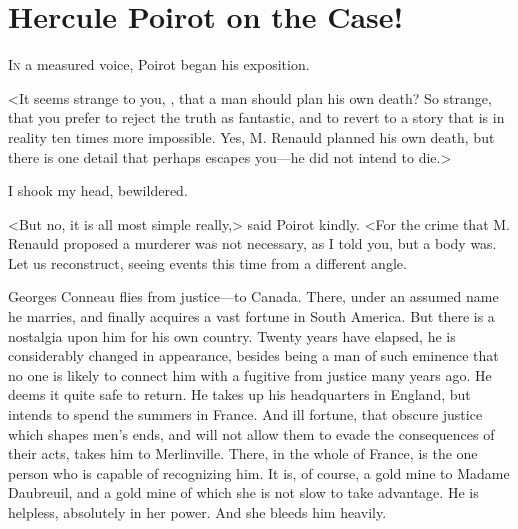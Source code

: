 \chapter{Hercule Poirot on the Case!}

\lettrine{I}{n} a measured voice, Poirot began his exposition. 

\zz
 <It seems strange to you, , that a man should plan his own death? So strange, that you prefer to reject the truth as fantastic, and to revert to a story that is in reality ten times more impossible. Yes, M. Renauld planned his own death, but there is one detail that perhaps escapes you—he did not intend to die.> 

 I shook my head, bewildered. 

 <But no, it is all most simple really,> said Poirot kindly. <For the crime that M. Renauld proposed a murderer was not necessary, as I told you, but a body was. Let us reconstruct, seeing events this time from a different angle. 

Georges Conneau flies from justice—to Canada. There, under an assumed name he marries, and finally acquires a vast fortune in South America. But there is a nostalgia upon him for his own country. Twenty years have elapsed, he is considerably changed in appearance, besides being a man of such eminence that no one is likely to connect him with a fugitive from justice many years ago. He deems it quite safe to return. He takes up his headquarters in England, but intends to spend the summers in France. And ill fortune, that obscure justice which shapes men's ends, and will not allow them to evade the consequences of their acts, takes him to Merlinville. There, in the whole of France, is the one person who is capable of recognizing him. It is, of course, a gold mine to Madame Daubreuil, and a gold mine of which she is not slow to take advantage. He is helpless, absolutely in her power. And she bleeds him heavily. 

